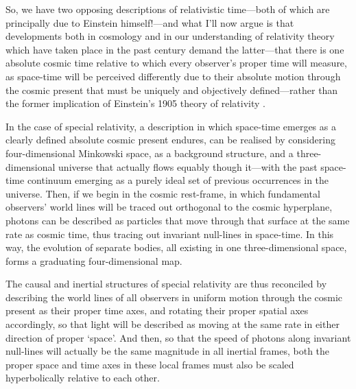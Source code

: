 \documentclass[11pt]{article}
\begin{document}
So, we have two opposing descriptions of relativistic time---both of which are principally due to Einstein himself!---and what I'll now argue is that developments both in cosmology and in our understanding of relativity theory which have taken place in the past century demand the latter---that there is one absolute cosmic time relative to which every observer's proper time will measure, as space-time will be perceived differently due to their absolute motion through the cosmic present that must be uniquely and objectively defined---rather than the former implication of Einstein's 1905 theory of relativity \cite{Einstein1905}. %

In the case of special relativity, a description in which space-time emerges as a clearly defined absolute cosmic present endures, can be realised by considering four-dimensional Minkowski space, as a background structure, and a three-dimensional universe that actually flows equably though it---with the past space-time continuum emerging as a purely ideal set of previous occurrences in the universe. Then, if we begin in the cosmic rest-frame, in which fundamental observers' world lines will be traced out orthogonal to the cosmic hyperplane, photons can be described as particles that move through that surface at the same rate as cosmic time, thus tracing out invariant null-lines in space-time. In this way, the evolution of separate bodies, all existing in one three-dimensional space, forms a graduating four-dimensional map. 

The causal and inertial structures of special relativity are thus reconciled by describing the world lines of all observers in uniform motion through the cosmic present as their proper time axes, and rotating their proper spatial axes accordingly, so that light will be described as moving at the same rate in either direction of proper `space'. And then, so that the speed of photons along invariant null-lines will actually be the same magnitude in all inertial frames, both the proper space and time axes in these local frames must also be scaled hyperbolically relative to each other.
\end{document}
